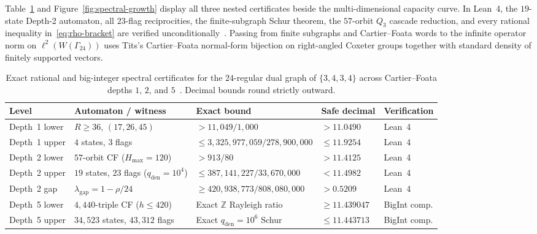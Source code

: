 Table~\ref{tab:spectral-summary} and Figure~\ref{fig:spectral-growth} display all three nested certificates beside the multi-dimensional capacity curve. In Lean~4, the $19$-state Depth-2 automaton, all $23$-flag reciprocities, the finite-subgraph Schur theorem, the $57$-orbit $Q_3$ cascade reduction, and every rational inequality in~\eqref{eq:rho-bracket} are verified unconditionally~\cite{pollard2026repo}. Passing from finite subgraphs and Cartier--Foata words to the infinite operator norm on $\ell^2(W(\Gamma_{24}))$ uses Tits's Cartier--Foata normal-form bijection on right-angled Coxeter groups together with standard density of finitely supported vectors.

\begin{table}[tb]
\centering
\caption{Exact rational and big-integer spectral certificates for the $24$-regular dual graph of $\{3,4,3,4\}$ across Cartier--Foata depths $1$, $2$, and $5$~\cite{pollard2026repo}. Decimal bounds round strictly outward.}
\label{tab:spectral-summary}
\footnotesize
\setlength{\tabcolsep}{4.5pt}
\begin{tabular}{@{}lllll@{}}
\toprule
Level & Automaton / witness & Exact bound & Safe decimal & Verification \\
\midrule
Depth~1 lower & $R \ge 36$, $(17,26,45)$ & $> 11{,}049/1{,}000$ & $> 11.0490$ & Lean~4 \\
Depth~1 upper & $4$ states, $3$ flags & $\le 3{,}325{,}977{,}059/278{,}900{,}000$ & $\le 11.9254$ & Lean~4 \\
Depth~2 lower & $57$-orbit CF ($H_{\max}=120$) & $> 913/80$ & $> 11.4125$ & Lean~4 \\
Depth~2 upper & $19$ states, $23$ flags ($q_{\mathrm{den}}=10^4$) & $\le 387{,}141{,}227/33{,}670{,}000$ & $< 11.4982$ & Lean~4 \\
Depth~2 gap & $\lambda_{\mathrm{gap}} = 1 - \rho/24$ & $\ge 420{,}938{,}773/808{,}080{,}000$ & $> 0.5209$ & Lean~4 \\
Depth~5 lower & $4{,}440$-triple CF ($h \le 420$) & Exact $\mathbb{Z}$ Rayleigh ratio & $\ge 11.439047$ & BigInt comp. \\
Depth~5 upper & $34{,}523$ states, $43{,}312$ flags & Exact $q_{\mathrm{den}}=10^6$ Schur & $\le 11.443713$ & BigInt comp. \\
\bottomrule
\end{tabular}
\end{table}

